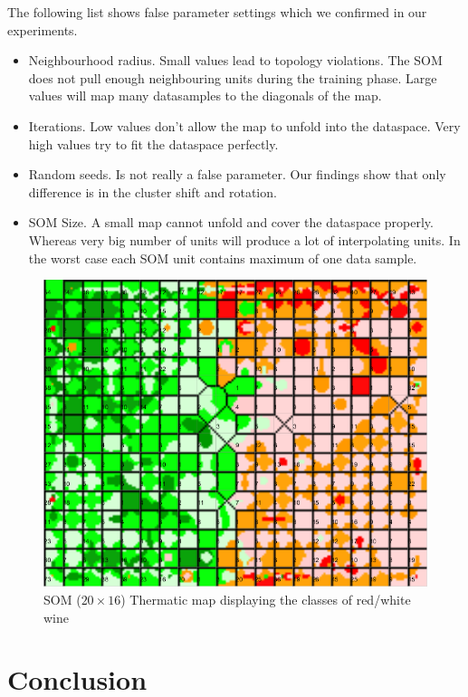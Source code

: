\documentclass{acm_proc_article-sp}
\begin{document}
The following list shows false parameter settings which we confirmed in our experiments.

\begin{itemize}
    \item Neighbourhood radius. Small values lead to topology violations.
        The SOM does not pull enough neighbouring units during the training phase.
        Large values will map many datasamples to the diagonals of the map.
    \item Iterations. Low values don't allow the map to unfold into the dataspace.
        Very high values try to fit the dataspace perfectly.
    \item Random seeds. Is not really a false parameter. Our findings show that
        only difference is in the cluster shift and rotation.
    \item SOM Size. A small map cannot unfold and cover the dataspace properly. Whereas very
        big number of units will produce a lot of interpolating units. In the worst case each
        SOM unit contains maximum of one data sample.
\end{itemize}

\begin{figure}
\centering
    \centering
    \includegraphics[width=\linewidth]{img/wine-newmid-thermatic-class-map}
    \caption{SOM ($20\times16$) Thermatic map displaying the classes of red/white wine}
    \label{fig:wine-newmid-thermatic-class-map}
\end{figure}

\section{Conclusion}




\end{document}
